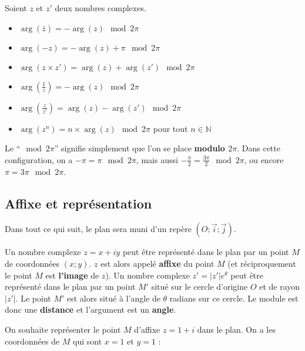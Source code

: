 	\begin{formula}[Formules]
		Soient $z$ et $z'$ deux nombres complexes.
		\begin{itemize}
			\item $\operatorname{arg}(\bar{z}) = - \operatorname{arg}(z) \mod 2\pi$
			\item $\operatorname{arg}(- z) = - \operatorname{arg}(z) + \pi \mod 2\pi$
			\item $\operatorname{arg}(z \times z') = \operatorname{arg}(z) + \operatorname{arg}(z') \mod 2\pi$
			\item $\operatorname{arg}{\left(\frac{1}{z}\right)} = - \operatorname{arg}(z) \mod 2\pi$
			\item $\operatorname{arg}{\left(\frac{z}{z'}\right)} = \operatorname{arg}(z) - \operatorname{arg}(z') \mod 2\pi$
			\item $\operatorname{arg}(z^n) = n \times \operatorname{arg}(z) \mod 2\pi$ pour tout $n \in \mathbb{N}$
		\end{itemize}
	\end{formula}

	\begin{tip}
		Le ``$\mod 2\pi$'' signifie simplement que l'on se place \textbf{modulo $2\pi$}. Dans cette configuration, on a $-\pi = \pi \mod 2\pi$, mais aussi $-\frac{\pi}{2} = \frac{3 \pi}{2} \mod 2\pi$, ou encore $\pi = 3\pi \mod 2\pi$.
	\end{tip}

	\subsection{Affixe et représentation}

	Dans tout ce qui suit, le plan sera muni d'un repère $(O; \overrightarrow{i}; \overrightarrow{j})$.

	\begin{formula}
		Un nombre complexe $z = x+iy$ peut être représenté dans le plan par un point $M$ de coordonnées $(x; y)$. $z$ est alors appelé \textbf{affixe} du point $M$ (et réciproquement le point $M$ est \textbf{l'image} de $z$).
		\newpar
		Un nombre complexe $z' = |z'| e^{\theta}$ peut être représenté dans le plan par un point $M'$ situé sur le cercle d'origine $O$ et de rayon
		$|z'|$. Le point $M'$ est alors situé à l'angle de $\theta$ radians sur ce cercle. Le module est donc une \textbf{distance} et l'argument est un \textbf{angle}.
	\end{formula}

	\begin{tip}[Exemple]
		On souhaite représenter le point $M$ d'affixe $z = 1 + i$ dans le plan. On a les coordonnées de $M$ qui sont $x = 1$ et $y = 1$ :
	\end{tip}

